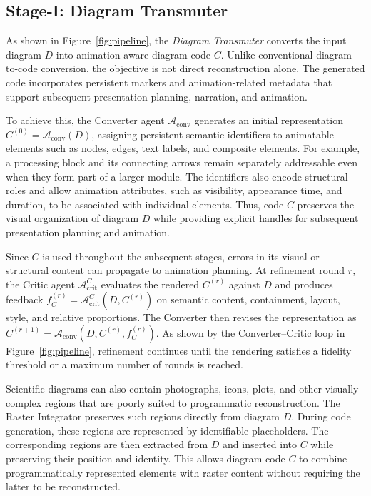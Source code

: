 \documentclass{article} %
\begin{document}
\subsection{Stage-I: Diagram Transmuter}

As shown in Figure~\ref{fig:pipeline}, the \textit{Diagram Transmuter} converts the input diagram $D$ into animation-aware diagram code $C$. Unlike conventional diagram-to-code conversion, the objective is not direct reconstruction alone. The generated code incorporates persistent markers and animation-related metadata that support subsequent presentation planning, narration, and animation.

To achieve this, the Converter agent $\mathcal{A}_{\mathrm{conv}}$ generates an initial representation $C^{(0)}=\mathcal{A}_{\mathrm{conv}}(D)$, assigning persistent semantic identifiers to animatable elements such as nodes, edges, text labels, and composite elements. For example, a processing block and its connecting arrows remain separately addressable even when they form part of a larger module. The identifiers also encode structural roles and allow animation attributes, such as visibility, appearance time, and duration, to be associated with individual elements. Thus,  code $C$ preserves the visual organization of diagram $D$ while providing explicit handles for subsequent presentation planning and animation.


Since $C$ is used throughout the subsequent stages, errors in its visual or structural content can propagate to animation planning. At refinement round $r$, the Critic agent $\mathcal{A}_{\mathrm{crit}}^{C}$ evaluates the rendered $C^{(r)}$ against $D$ and produces feedback $f_C^{(r)}=\mathcal{A}_{\mathrm{crit}}^{C}(D,C^{(r)})$ on semantic content, containment, layout, style, and relative proportions. The Converter then revises the representation as $C^{(r+1)}=\mathcal{A}_{\mathrm{conv}}(D,C^{(r)},f_C^{(r)})$. As shown by the Converter--Critic loop in Figure~\ref{fig:pipeline}, refinement continues until the rendering satisfies a fidelity threshold or a maximum number of rounds is reached.

Scientific diagrams can also contain photographs, icons, plots, and other visually complex regions that are poorly suited to programmatic reconstruction. The Raster Integrator preserves such regions directly from diagram $D$. During code generation, these regions are represented by identifiable placeholders. The corresponding regions are then extracted from $D$ and inserted into $C$ while preserving their position and identity. This allows diagram code $C$ to combine programmatically represented elements with raster content without requiring the latter to be reconstructed.
\end{document}
